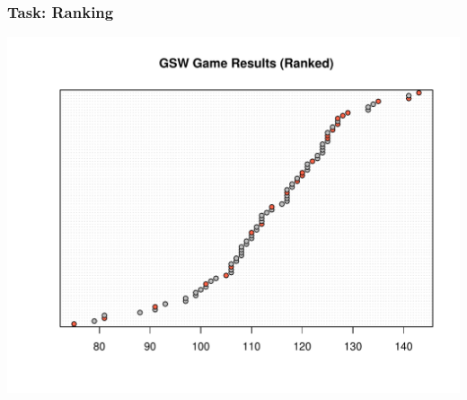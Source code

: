 \documentclass[12pt]{beamer}\usepackage[]{graphicx}\usepackage[]{color}
\makeatletter
\def\maxwidth{ %
  \ifdim\Gin@nat@width>\linewidth
    \linewidth
  \else
    \Gin@nat@width
  \fi
}
\newenvironment{knitrout}{}{} %
\makeatother
\begin{document}
\begin{frame}[fragile]
\frametitle{Task: Ranking}

\begin{knitrout}\footnotesize
{}\color{fgcolor}

{\centering \includegraphics[width=\maxwidth]{figure/task_ranking-1} 

}



\end{knitrout}

\end{frame}

\end{document}
